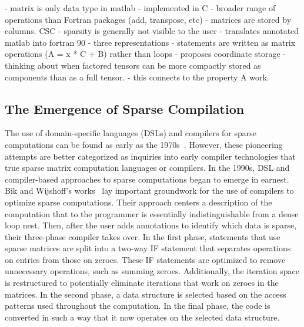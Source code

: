 \cite{gilbert1992sparse}
- matrix is only data type in matlab
- implemented in C
- broader range of operations than Fortran packages (add, transpose, etc)
- matrices are stored by columns. CSC
- sparsity is generally not visible to the user
\cite{kawabata2004matlab}
- translates annotated matlab into fortran 90
- three representations
- statements are written as matrix operations (A = x * C + B) rather than loops
\cite{bader2008efficient}
- proposes coordinate storage
- thinking about when factored tensors can be more compactly stored as components than as a full tensor.
- this connects to the property A work.

\cite{ogielski1993sparse}
\cite{erhel1995parallel}
\cite{ujaldon1996parallelization}
\cite{catalyurek1999hypergraph}
\cite{filippone2000psblas}

\cite{bouaricha1994tensor} 
\cite{bouaricha1999tensor}
\cite{lin2002efficient}
\cite{kolda2008scalable}

\cite{irwin1997aspect}
\cite{hackbusch1999sparse}
\cite{ashcraft1999spooles}


\subsection{The Emergence of Sparse Compilation}

The use of domain-specific languages (DSLs) and compilers for sparse computations can be found as early as the 1970s~\cite{calahan1971description,mchugh1974simpl}.
However, these pioneering attempts are better categorized as inquiries into early compiler technologies that true sparse matrix computation languages or compilers. 
In the 1990s, DSL and compiler-based approaches to sparse computations began to emerge in earnest.
Bik and Wijshoff's works~\cite{bik1993compilation, bik1993automatic,bik1996automatic} lay important groundwork for the use of compilers to optimize sparse computations.
Their approach centers a description of the computation that to the programmer is essentially indistinguishable from a dense loop nest. 
Then, after the user adds annotations to identify which data is sparse, their three-phase compiler takes over.
In the first phase, statements that use sparse matrices are split into a two-way IF statement that separates operations on entries from those on zeroes. 
These IF statements are optimized to remove unnecessary operations, such as summing zeroes.
Additionally, the iteration space is restructured to potentially eliminate iterations that work on zeroes in the matrices. 
In the second phase, a  data structure is selected based on the access patterns used throughout the computation. 
In the final phase, the code is converted in such a way that it now operates on the selected data structure.

